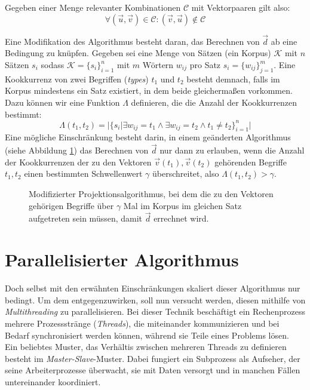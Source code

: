 Gegeben einer Menge relevanter Kombinationen $\mathcal{C}$ mit Vektorpaaren gilt also:
\begin{equation}
  \forall (\vec{u}, \vec{v}) \in \mathcal{C}: (\vec{v}, \vec{u}) \notin \mathcal{C}
\end{equation}

Eine Modifikation des Algorithmus besteht daran, das Berechnen von $\vec{d}$ ab eine Bedingung zu knüpfen.
Gegeben sei eine Menge von Sätzen (ein Korpus) $\mathcal{K}$ mit $n$ Sätzen $s_i$ sodass $\mathcal{K} = \{s_i\}_{i=1}^{n}$ mit
$m$ Wörtern $w_{ij}$ pro Satz $s_i = \{w_{ij}\}_{j=1}^m$. Eine Kookkurrenz von zwei Begriffen (\emph{types}) $t_1$ und $t_2$
besteht demnach, falls im Korpus mindestens ein Satz existiert, in dem beide gleichermaßen vorkommen. Dazu können wir
eine Funktion $\Lambda$ definieren, die die Anzahl der Kookkurrenzen bestimmt:
\begin{equation}
  \Lambda(t_1, t_2) = |\{s_i | \exists w_{ij} = t_1 \land \exists w_{ij} = t_2 \land t_1\neq t_2\}_{i=1}^{n}|
\end{equation}
Eine mögliche Einschränkung besteht darin, in einem geänderten Algorithmus (siehe Abbildung \ref{fig:algo2}) das Berechnen von $\vec{d}$ nur
dann zu erlauben, wenn die Anzahl der Kookkurrenzen der zu den Vektoren $\vec{v}(t_1), \vec{v}(t_2)$ gehörenden Begriffe $t_1, t_2$
einen bestimmten Schwellenwert $\gamma$ überschreitet, also $\Lambda(t_1, t_2) > \gamma$.

\begin{figure}[h]
  \centering
  \begin{algorithm}[H]
  \end{algorithm}
  \caption[Modifizierter Projektionsalgorithmus]{Modifizierter Projektionsalgorithmus, bei dem die zu den Vektoren gehörigen
  Begriffe über $\gamma$ Mal im Korpus im gleichen Satz aufgetreten sein müssen, damit $\vec{d}$ errechnet wird.\label{fig:algo2}}
\end{figure}


\section{Parallelisierter Algorithmus}

Doch selbst mit den erwähnten Einschränkungen skaliert dieser Algorithmus nur bedingt. Um dem entgegenzuwirken, soll nun
versucht werden, diesen mithilfe von \emph{Multithreading} zu parallelisieren. Bei dieser Technik beschäftigt ein Rechenprozess
mehrere Prozessstränge (\emph{Threads}), die miteinander kommunizieren und bei Bedarf synchronisiert werden können,
während sie Teile eines Problems lösen.\\
Ein beliebtes Muster, das Verhältis zwischen mehreren Threads zu definieren besteht im \emph{Master-Slave}-Muster.
Dabei fungiert ein Subprozess als Aufseher, der seine Arbeiterprozesse überwacht, sie mit Daten versorgt und in manchen
Fällen untereinander koordiniert.\\ \\

